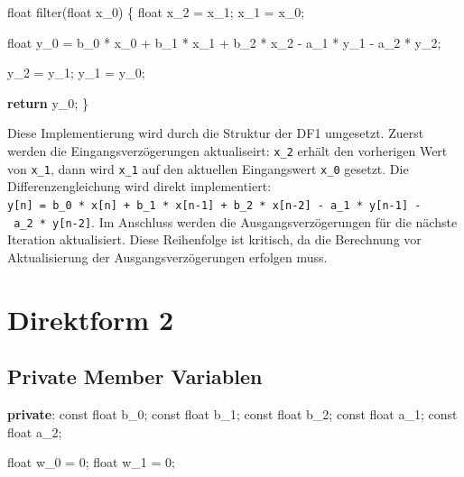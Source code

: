 \documentclass[
  ngerman,
  letterpaper,
  DIV=11]{scrreprt}
\newenvironment{Shaded}{\begin{snugshade}}{\end{snugshade}}
\newcommand{\AttributeTok}[1]{\textcolor[rgb]{0.40,0.45,0.13}{#1}}
\newcommand{\ControlFlowTok}[1]{\textcolor[rgb]{0.00,0.23,0.31}{\textbf{#1}}}
\newcommand{\DataTypeTok}[1]{\textcolor[rgb]{0.68,0.00,0.00}{#1}}
\newcommand{\DecValTok}[1]{\textcolor[rgb]{0.68,0.00,0.00}{#1}}
\newcommand{\KeywordTok}[1]{\textcolor[rgb]{0.00,0.23,0.31}{\textbf{#1}}}
\newcommand{\NormalTok}[1]{\textcolor[rgb]{0.00,0.23,0.31}{#1}}
\newcommand{\OperatorTok}[1]{\textcolor[rgb]{0.37,0.37,0.37}{#1}}
\begin{document}
\begin{Shaded}
\begin{Highlighting}[]
\DataTypeTok{float}\NormalTok{ filter}\OperatorTok{(}\DataTypeTok{float}\NormalTok{ x\_0}\OperatorTok{)}
\OperatorTok{\{}
  \DataTypeTok{float}\NormalTok{ x\_2 }\OperatorTok{=}\NormalTok{ x\_1}\OperatorTok{;}
\NormalTok{  x\_1 }\OperatorTok{=}\NormalTok{ x\_0}\OperatorTok{;}
    
  \DataTypeTok{float}\NormalTok{ y\_0 }\OperatorTok{=}\NormalTok{ b\_0 }\OperatorTok{*}\NormalTok{ x\_0 }\OperatorTok{+}\NormalTok{ b\_1 }\OperatorTok{*}\NormalTok{ x\_1 }\OperatorTok{+}\NormalTok{ b\_2 }\OperatorTok{*}\NormalTok{ x\_2 }\OperatorTok{{-}}\NormalTok{ a\_1 }\OperatorTok{*}\NormalTok{ y\_1 }\OperatorTok{{-}}\NormalTok{ a\_2 }\OperatorTok{*}\NormalTok{ y\_2}\OperatorTok{;}
    
\NormalTok{  y\_2 }\OperatorTok{=}\NormalTok{ y\_1}\OperatorTok{;}
\NormalTok{  y\_1 }\OperatorTok{=}\NormalTok{ y\_0}\OperatorTok{;}

  \ControlFlowTok{return}\NormalTok{ y\_0}\OperatorTok{;}
\OperatorTok{\}}  
\end{Highlighting}
\end{Shaded}

Diese Implementierung wird durch die Struktur der DF1 umgesetzt. Zuerst
werden die Eingangsverzögerungen aktualiseirt: \texttt{x\_2} erhält den
vorherigen Wert von \texttt{x\_1}, dann wird \texttt{x\_1} auf den
aktuellen Eingangswert \texttt{x\_0} gesetzt. Die Differenzengleichung
wird direkt implementiert:
\texttt{y{[}n{]}\ =\ b\_0\ *\ x{[}n{]}\ +\ b\_1\ *\ x{[}n-1{]}\ +\ b\_2\ *\ x{[}n-2{]}\ -\ a\_1\ *\ y{[}n-1{]}\ -\ a\_2\ *\ y{[}n-2{]}}.
Im Anschluss werden die Ausgangsverzögerungen für die nächste Iteration
aktualisiert. Diese Reihenfolge ist kritisch, da die Berechnung vor
Aktualisierung der Ausgangsverzögerungen erfolgen muss.

\section{Direktform 2}\label{direktform-2}

\subsection{Private Member Variablen}\label{private-member-variablen-1}

\begin{Shaded}
\begin{Highlighting}[]
\KeywordTok{private}\OperatorTok{:}
  \AttributeTok{const} \DataTypeTok{float}\NormalTok{ b\_0}\OperatorTok{;} 
  \AttributeTok{const} \DataTypeTok{float}\NormalTok{ b\_1}\OperatorTok{;}
  \AttributeTok{const} \DataTypeTok{float}\NormalTok{ b\_2}\OperatorTok{;}
  \AttributeTok{const} \DataTypeTok{float}\NormalTok{ a\_1}\OperatorTok{;}
  \AttributeTok{const} \DataTypeTok{float}\NormalTok{ a\_2}\OperatorTok{;}

  \DataTypeTok{float}\NormalTok{ w\_0 }\OperatorTok{=} \DecValTok{0}\OperatorTok{;}
  \DataTypeTok{float}\NormalTok{ w\_1 }\OperatorTok{=} \DecValTok{0}\OperatorTok{;}
\end{Highlighting}
\end{Shaded}
\end{document}
